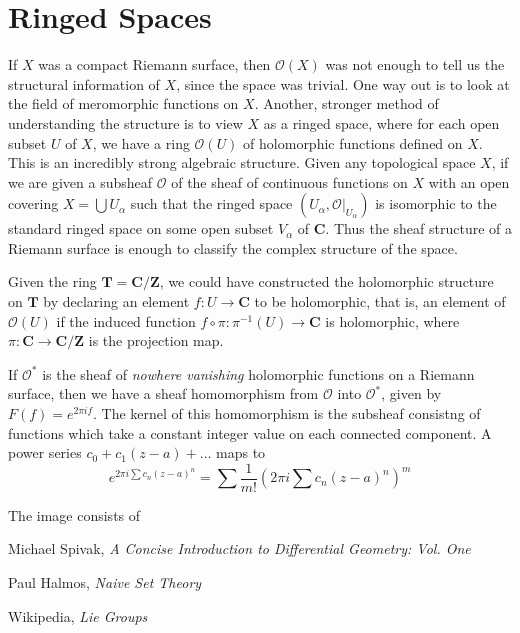 \section{Ringed Spaces}

If $X$ was a compact Riemann surface, then $\mathcal{O}(X)$ was not enough to tell us the structural information of $X$, since the space was trivial. One way out is to look at the field of meromorphic functions on $X$. Another, stronger method of understanding the structure is to view $X$ as a ringed space, where for each open subset $U$ of $X$, we have a ring $\mathcal{O}(U)$ of holomorphic functions defined on $X$. This is an incredibly strong algebraic structure. Given any topological space $X$, if we are given a subsheaf $\mathcal{O}$ of the sheaf of continuous functions on $X$ with an open covering $X = \bigcup U_\alpha$ such that the ringed space $(U_\alpha, \mathcal{O}|_{U_\alpha})$ is isomorphic to the standard ringed space on some open subset $V_\alpha$ of $\mathbf{C}$. Thus the sheaf structure of a Riemann surface is enough to classify the complex structure of the space.

\begin{example}
    Given the ring $\mathbf{T} = \mathbf{C}/\mathbf{Z}$, we could have constructed the holomorphic structure on $\mathbf{T}$ by declaring an element $f: U \to \mathbf{C}$ to be holomorphic, that is, an element of $\mathcal{O}(U)$ if the induced function $f \circ \pi: \pi^{-1}(U) \to \mathbf{C}$ is holomorphic, where $\pi: \mathbf{C} \to \mathbf{C} / \mathbf{Z}$ is the projection map.
\end{example}

If $\mathcal{O}^*$ is the sheaf of {\it nowhere vanishing} holomorphic functions on a Riemann surface, then we have a sheaf homomorphism from $\mathcal{O}$ into $\mathcal{O}^*$, given by $F(f) = e^{2 \pi i f}$. The kernel of this homomorphism is the subsheaf consistng of functions which take a constant integer value on each connected component. A power series $c_0 + c_1(z - a) + \dots$ maps to
%
\[ e^{2 \pi i \sum c_n (z - a)^n} = \sum \frac{1}{m!} (2 \pi i \sum c_n (z - a)^n)^m \]

The image consists of 













\begin{thebibliography}{10}
     Michael Spivak,
    \emph{A Concise Introduction to Differential Geometry: Vol. One}

     Paul Halmos,
    \emph{Naive Set Theory}

     Wikipedia,
    \emph{Lie Groups}
\end{thebibliography}

